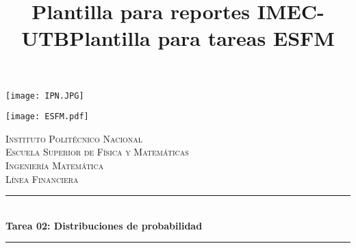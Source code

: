 \documentclass[10pt]{article}\usepackage[]{graphicx}\usepackage[]{color}
\title{Plantilla para reportes IMEC-UTB}
\title{Plantilla para tareas ESFM}
\begin{document}
\begin{center}																		%
\newcommand{\HRule}{\rule{\linewidth}{0.5mm}}									%
\begin{minipage}{0.48\textwidth} \begin{flushleft}
\texttt{[image: IPN.JPG]}
\end{flushleft}\end{minipage}
\begin{minipage}{0.48\textwidth} \begin{flushright}
\texttt{[image: ESFM.pdf]}
\end{flushright}\end{minipage}

\vspace*{1.0cm}								%
\textsc{\huge Instituto Politécnico Nacional \\ \vspace{5px} Escuela Superior de Física y Matemáticas}\\[1.5cm]	

\textsc{\LARGE  Ingeniería Matemática \\ \vspace{5px} Línea Financiera }\\[1.5cm]													%


 			\vspace*{1cm}																		%
\HRule \\[0.4cm]																	%
{ \huge \bfseries Tarea 02: Distribuciones de probabilidad}\\[0.4cm]	%
\HRule \\[1 cm]																	%
\begin{minipage}{0.46\textwidth}													%
\begin{flushleft} \large															%


\end{flushleft}
\end{minipage}
\end{center}
\end{document}
